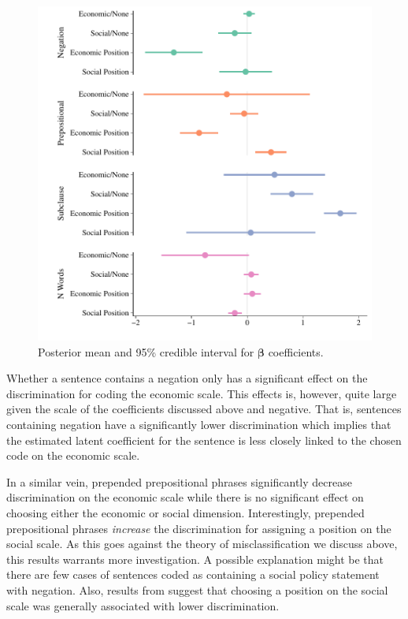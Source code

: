 \documentclass[a4paper, 12pt]{article}
\begin{document}
\begin{figure}[htpb]
  \centering
  \includegraphics[width=0.8\linewidth]{beta_coefficients.pdf}
  \caption{Posterior mean and 95\% credible interval for $\bm\beta$ coefficients.}
  \label{fig:beta_coefficients}
\end{figure}

Whether a sentence contains a negation only has a significant effect on the discrimination for coding the economic scale. This effects is, however, quite large given the scale of the coefficients discussed above and negative. That is, sentences containing negation have a significantly lower discrimination which implies that the estimated latent coefficient for the sentence is less closely linked to the chosen code on the economic scale.

In a similar vein, prepended prepositional phrases significantly decrease discrimination on the economic scale while there is no significant effect on choosing either the economic or social dimension. Interestingly, prepended prepositional phrases \emph{increase} the discrimination for assigning a position on the social scale. As this goes against the theory of misclassification we discuss above, this results warrants more investigation. A possible explanation might be that there are few cases of sentences coded as containing a social policy statement with negation. Also, results from \citet{Benoit2016} suggest that choosing a position on the social scale was generally associated with lower discrimination.
\end{document}
